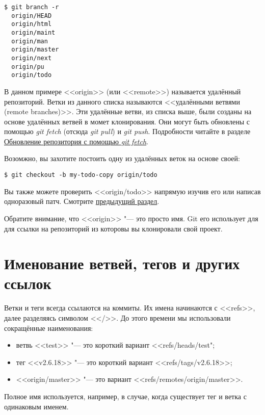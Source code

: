 \documentclass[a4paper, 12pt]{report}
\begin{document}
\begin{lstlisting}
$ git branch -r
  origin/HEAD
  origin/html
  origin/maint
  origin/man
  origin/master
  origin/next
  origin/pu
  origin/todo
\end{lstlisting}

В данном примере <<origin>> (или <<remote>>) называется удалённый репозиторий. 
Ветки из данного списка называются <<удалёнными ветвями (remote branches)>>. 
Эти удалённые ветви, из списка выше, были созданы на основе удалённых ветвей в 
момет клонирования. Они могут быть обновлены с помощью \emph{git fetch} (отсюда
\emph{git pull}) и \emph{git push}. Подробности читайте в разделе 
\href{#chapter1:update-a-repository-with-git-fetch}{Обновление репозитория с помощью
\emph{git fetch}}.

Возомжно, вы захотите постоить одну из удалённых веток на основе своей:

\begin{lstlisting}
$ git checkout -b my-todo-copy origin/todo
\end{lstlisting}

Вы также можете проверить <<origin/todo>> напрямую изучив его или написав одноразовый
патч. Смотрите \href{#chapter1:examining-an-old-version-without-creating-a-new-branch}
{предыдущий раздел}.

Обратите внимание, что <<origin>> "--- это просто имя. Git его использует для 
для ссылки на репозиторий из которовы вы клонировали свой проект.


\section{Именование ветвей, тегов и других ссылок}

Ветки и теги всегда ссылаются на коммиты. Их имена начинаются с <<refs>>, далее
разделяясь символом <</>>. До этого времени мы использовали сокращённые наименования:

\begin{itemize}
\item ветвь <<test>> "--- это короткий вариант <<refs/heads/test";
\item тег <<v2.6.18>> "--- это короткий вариант <<refs/tags/v2.6.18>>;
\item <<origin/master>> "--- это вариант <<refs/remotes/origin/master>>.
\end{itemize}

Полное имя используется, например, в случае, когда существует тег и ветка с одинаковым
именем.
%
%
\end{document}

